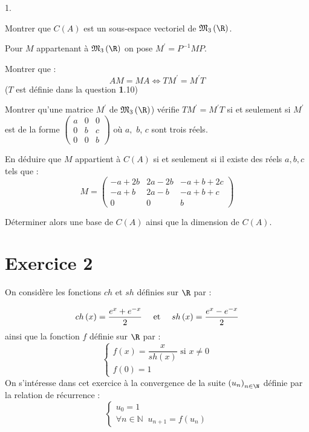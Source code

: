 \documentclass[11pt]{article}%
\begin{document}
\begin{noliste}{1.}
 \setlength{\itemsep}{4mm}
\item Montrer que $C(A)$ est un sous-espace vectoriel de
$\mathfrak{M}_{3}\left( \R\right) $.

\item Pour $M$ appartenant à $\mathfrak{M}_{3}\left( \R\right) $ on
pose $M^{\prime } = P^{-1}MP.$

Montrer que : 
\[
AM = MA\Longleftrightarrow TM^{\prime } = M^{\prime }T
\]
($T$ est définie dans la question \textbf{1}.10)

\item Montrer qu'une matrice $M^{\prime }$ de $\mathfrak{M}_{3}\left( 
\R\right) $) vérifie $TM^{\prime } = M^{\prime }T$ si et seulement si
$M^{\prime }$ est de la forme $\left( 
\begin{array}{lll}
a & 0 & 0 \\
0 & b & c \\
0 & 0 & b
\end{array}
\right) $ où $a,$ $b$, $c$ sont trois réels.

\item En déduire que $M$ appartient à $C(A)$ si et seulement si il
existe
des réels $a,b,c$ tels que : 
\[
M = \left( 
\begin{array}{ccc}
-a + 2b & 2a-2b & -a + b + 2c \\
-a + b & 2a-b & -a + b + c \\
0 & 0 & b
\end{array}
\right)
\]

\item Déterminer alors une base de $C(A)$ ainsi que la dimension de
$C(A)$.
\end{noliste}

\section*{\protect\LARGE Exercice 2}

On considère les fonctions $ch$ et $sh$ définies sur $\R$ par :

\[
ch\left( x\right) = \dfrac{e^{x} + e^{-x}}{2} \text{ \quad et \quad
}sh\left( x\right) = \dfrac{e^{x}-e^{-x}}{2}
\]
ainsi que la fonction $f$ définie sur $\R$ par : 
\[
\left\{ 
\begin{array}{l}
f\left( x\right) = \dfrac{x}{sh\left( x\right) }\text{ si }x\neq 0 \\
f\left( 0\right) = 1
\end{array}
\right.
\]
On s'intéresse dans cet exercice à la convergence de la suite $\left(
u_{n}\right)_{n\in \N}$ définie par la relation de récurrence : 
\[
\left\{ 
\begin{array}{l}
u_{0} = 1 \\
\forall n\in \mathbb{N\;\;}u_{n + 1} = f\left( u_{n}\right)
\end{array}
\right.
\]
\end{document}
